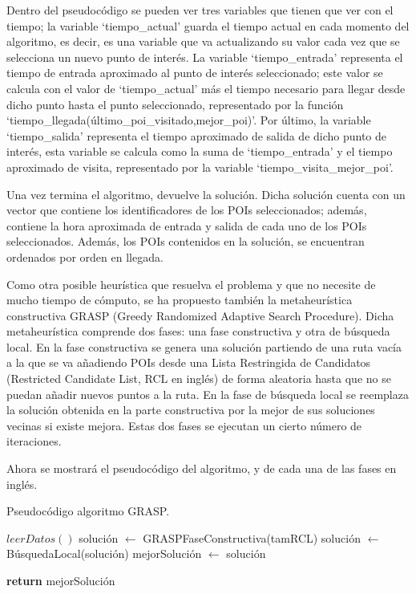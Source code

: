 Dentro del pseudocódigo se pueden ver tres variables que tienen que ver con el tiempo; la variable \enquote*{tiempo\_actual} guarda el tiempo actual en cada momento del algoritmo, es decir, es una variable que va actualizando su valor cada vez que se selecciona un nuevo punto de interés. La variable \enquote*{tiempo\_entrada} representa el tiempo de entrada aproximado al punto de interés seleccionado; este valor se calcula con el valor de \enquote*{tiempo\_actual} más el tiempo necesario para llegar desde dicho punto hasta el punto seleccionado, representado por la función \enquote*{tiempo\_llegada(último\_poi\_visitado,mejor\_poi)}. Por último, la variable \enquote*{tiempo\_salida} representa el tiempo aproximado de salida de dicho punto de interés, esta variable se calcula como la suma de \enquote*{tiempo\_entrada} y el tiempo aproximado de visita, representado por la variable  \enquote*{tiempo\_visita\_mejor\_poi}.\newline

Una vez termina el algoritmo, devuelve la solución. Dicha solución cuenta con un vector que contiene los identificadores de los POIs seleccionados; además, contiene la hora aproximada de entrada y salida de cada uno de los POIs seleccionados. Además, los POIs contenidos en la solución, se encuentran ordenados por orden en llegada.\newline

Como otra posible heurística que resuelva el problema y que no necesite de mucho tiempo de cómputo, se ha propuesto también la metaheurística constructiva GRASP (Greedy Randomized Adaptive Search Procedure). Dicha metaheurística comprende dos fases: una fase constructiva y otra de búsqueda local. En la fase constructiva se genera una solución partiendo de una ruta vacía a la que se va añadiendo POIs desde una Lista Restringida de Candidatos (Restricted Candidate List, RCL en inglés) de forma aleatoria hasta que no se puedan añadir nuevos puntos a la ruta. En la fase de búsqueda local se reemplaza la solución obtenida en la parte constructiva por la mejor de sus soluciones vecinas si existe mejora. Estas dos fases se ejecutan un cierto número de iteraciones.\newline

Ahora se mostrará el pseudocódigo del algoritmo, y de cada una de las fases en inglés.
\vspace{0.06in}

\begin{algorithm}
	\caption{Pseudocódigo algoritmo GRASP.}
	\label{alg:grasp}
\begin{algorithmic}
	\State $ leerDatos() $
		\State solución $ \gets $ GRASPFaseConstructiva(tamRCL)
		\State  solución $\gets$ BúsquedaLocal(solución)
			\State  mejorSolución $\gets$ solución
		\EndIf
	\EndFor
	
	\State \textbf{return} mejorSolución
	\EndFunction
\end{algorithmic}
\end{algorithm}

